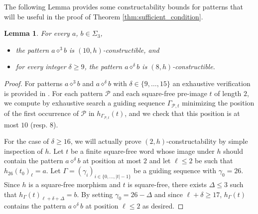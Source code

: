 \documentclass[12pt]{article}
\newtheorem{lemma}[theorem]{Lemma}
\theoremstyle{definition}
\newcommand{\patternprime}[3]{{#1}\diamond^{#2}{#3}}
\begin{document}
The following Lemma provides some constructability bounds for patterns that will be useful in the proof of Theorem \ref{thm:sufficient_condition}.

\begin{lemma}\label{lemma:Delta_constructability_of_A3B_and_Ageq9B_bis}
    For every $a$, $b \in \Sigma_3$,
    \begin{itemize}
        \item the pattern $\patternprime{a}{3}{b}$ is $(10, h)$-constructible, and
        \item for every integer $\delta \ge 9$, the pattern $\patternprime{a}{\delta}{b}$ is $(8, h)$-constructible.
    \end{itemize}
\end{lemma}

\begin{proof}
For patterns $\patternprime{a}{3}{b}$ and $\patternprime{a}{\delta}{b}$ with $\delta \in \{9, \dots, 15\}$ an exhaustive verification is provided in \cite[lemma\_\ref{lemma:Delta_constructability_of_A3B_and_Ageq9B_bis}.cpp]{code}. For each pattern $\mathcal{P}$ and each square-free pre-image $t$ of length $2$, we compute by exhaustive search a guiding sequence $\Gamma_{\mathcal{P}, t}$ minimizing the position of the first occurrence of $\mathcal{P}$ in $h_{\Gamma_{\mathcal{P}, t}}(t)$, and we check that this position is at most $10$ (resp. $8$).

For the case of $\delta \geq 16$, we will actually prove $(2, h)$-constructability by simple inspection of $h$. Let $t$ be a finite square-free word whose image under $h$ should contain the pattern $\patternprime{a}{\delta}{b}$ at position at most $2$ and let $\ell \le 2$ be such that $h_{26}(t_0)_\ell = a$. Let $\Gamma = (\gamma_i)_{i \in \{0,\dots, |t| - 1\}}$ be a guiding sequence with $\gamma_0 = 26$. Since $h$ is a square-free morphism and $t$ is square-free, there exists $\Delta \le 3$ such that $h_\Gamma(t)_{\ell + \delta + \Delta} = b$. By setting $\gamma_0 = 26 - \Delta$ and since $\ell + \delta \ge 17$, $h_\Gamma(t)$ contains the pattern $\patternprime{a}{\delta}{b}$ at position $\ell \le 2$ as desired.
\end{proof}
\end{document}
